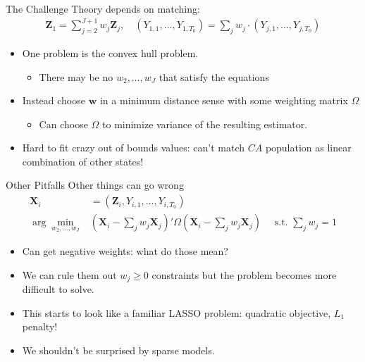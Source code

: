 \documentclass[aspectratio=169,11pt]{beamer}
\begin{document}
\begin{frame}{The Challenge}
Theory depends on matching:
\begin{align*}
\mathbf{Z}_{1}= \sum_{j=2}^{J+1} w_{j} \mathbf{Z}_{j}, \quad
\left({Y_{1,1},\ldots, Y_{1,T_0}} \right)= \sum_j w_j \cdot \left({Y_{j,1},\ldots, Y_{j,T_0}} \right)
\end{align*}
\begin{itemize}
\item One problem is the \alert{convex hull} problem. 
\begin{itemize}
\item There may be no $w_2,\ldots,w_J$ that satisfy the equations 
\end{itemize}
\item Instead choose $\mathbf{w}$ in a \alert{minimum distance sense} with some weighting matrix $\Omega$
\begin{itemize}
\item Can choose $\Omega$ to minimize variance of the resulting estimator.
\end{itemize}
\item Hard to fit crazy out of bounds values: can't match $CA$ population as linear combination of other states!
\end{itemize}
\end{frame}

\begin{frame}{Other Pitfalls}
Other things can go wrong
\begin{align*}
\mathbf{X}_{i}&=\left(\mathbf{Z}_{i}, Y_{i,1},\ldots, Y_{i,T_0} \right)\\
\arg \min_{w_2,\ldots, w_J}&  (\mathbf{X}_{i}-\sum_j w_j \mathbf{X}_{j})' \Omega  (\mathbf{X}_{i}-\sum_j w_j \mathbf{X}_{j}) \quad \text{ s.t. }  \sum_j w_j =1
\end{align*}

\begin{itemize}
\item Can get negative weights: what do those mean? 
\item We can rule them out $w_j \geq 0$ constraints but the problem becomes more difficult to solve.
\item This starts to look like a familiar LASSO problem: quadratic objective, $L_1$ penalty!
\item We shouldn't be surprised by sparse models.
\end{itemize}
\end{frame}
\end{document}
